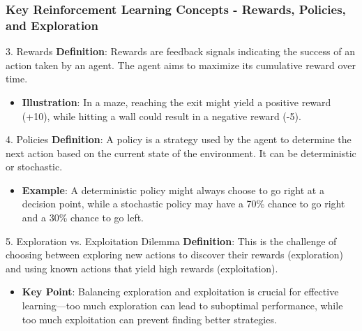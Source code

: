 \documentclass{beamer}
\begin{document}
\begin{frame}[fragile]
    \frametitle{Key Reinforcement Learning Concepts - Rewards, Policies, and Exploration}
    \begin{block}{3. Rewards}
        \textbf{Definition}: Rewards are feedback signals indicating the success of an action taken by an agent. The agent aims to maximize its cumulative reward over time.
        \begin{itemize}
            \item \textbf{Illustration}: In a maze, reaching the exit might yield a positive reward (+10), while hitting a wall could result in a negative reward (-5).
        \end{itemize}
    \end{block}

    \begin{block}{4. Policies}
        \textbf{Definition}: A policy is a strategy used by the agent to determine the next action based on the current state of the environment. It can be deterministic or stochastic.
        \begin{itemize}
            \item \textbf{Example}: A deterministic policy might always choose to go right at a decision point, while a stochastic policy may have a 70\% chance to go right and a 30\% chance to go left.
        \end{itemize}
    \end{block}
    
    \begin{block}{5. Exploration vs. Exploitation Dilemma}
        \textbf{Definition}: This is the challenge of choosing between exploring new actions to discover their rewards (exploration) and using known actions that yield high rewards (exploitation).
        \begin{itemize}
            \item \textbf{Key Point}: Balancing exploration and exploitation is crucial for effective learning—too much exploration can lead to suboptimal performance, while too much exploitation can prevent finding better strategies.
        \end{itemize}
    \end{block}
\end{frame}
\end{document}
